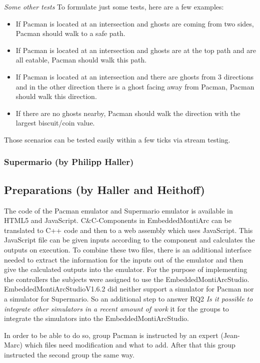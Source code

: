 \emph{Some other tests}\newline
To formulate just some tests, here are a few examples:
\begin{itemize}
	\item If Pacman is located at an intersection and ghosts are coming from two sides, Pacman should walk to a safe path.
	\item If Pacman is located at an intersection and ghosts are at the top path and are all eatable, Pacman should walk this path.
	\item If Pacman is located at an intersection and there are ghosts from 3 directions and in the other direction there is a ghost facing away from Pacman, Pacman should walk this direction.
	\item If there are no ghosts nearby, Pacman should walk the direction with the largest biscuit/coin value.
\end{itemize}

Those scenarios can be tested easily within a few ticks via stream testing.

\subsubsection{Supermario (by Philipp Haller)}


\subsection{Preparations (by Haller and Heithoff)}
The code of the Pacman emulator \cite{PacmanLink} and Supermario emulator \cite{marioLink} is available in HTML5 and JavaScript. C\&C-Components in EmbeddedMontiArc can be translated to C++ code and then to a web assembly \cite{KRSvW18} which uses JavaScript. This JavaScript file can be given inputs according to the component and calculates the outputs on execution. To combine these two files, there is an additional interface needed to extract the information for the inputs out of the emulator and then give the calculated outputs into the emulator.
For the purpose of implementing the controllers the subjects were assigned to use the EmbeddedMontiArcStudio.
EmbeddedMontiArcStudioV1.6.2 did neither support a simulator for Pacman nor a simulator for Supermario. So an additional step to answer RQ2 \textit{Is it possible to integrate other simulators in a recent amount of work} it for the groups to integrate the simulators into the EmbeddedMontiArcStudio.

In order to be able to do so, group Pacman is instructed by an expert (Jean-Marc) which files need modification and what to add. After that this group instructed the second group the same way.

